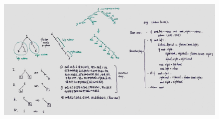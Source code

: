 \documentclass[a4paper,10pt]{article}
\begin{document}
\begin{figure}[h]
    \includegraphics[width=\textwidth]{leetcode114.jpg}
    \centering \\
\end{figure}
\end{document}
